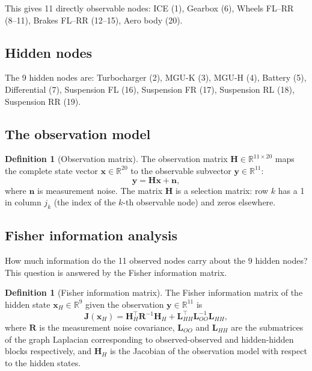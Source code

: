\documentclass[twocolumn,10pt,a4paper]{article}
\theoremstyle{definition}
\newtheorem{definition}[theorem]{Definition}
\theoremstyle{remark}
\newcommand{\R}{\mathbb{R}}
\newcommand{\vect}[1]{\boldsymbol{#1}}
\newcommand{\mat}[1]{\mathbf{#1}}
\begin{document}
This gives 11 directly observable nodes: ICE (1), Gearbox (6), Wheels FL--RR (8--11), Brakes FL--RR (12--15), Aero body (20).

\subsection{Hidden nodes}

The 9 hidden nodes are: Turbocharger (2), MGU-K (3), MGU-H (4), Battery (5), Differential (7), Suspension FL (16), Suspension FR (17), Suspension RL (18), Suspension RR (19).

\subsection{The observation model}

\begin{definition}[Observation matrix]\label{def:observation_matrix}
The observation matrix $\mat{H} \in \R^{11 \times 20}$ maps the complete state vector $\vect{x} \in \R^{20}$ to the observable subvector $\vect{y} \in \R^{11}$:
\begin{equation}\label{eq:observation}
    \vect{y} = \mat{H} \vect{x} + \vect{n},
\end{equation}
where $\vect{n}$ is measurement noise. The matrix $\mat{H}$ is a selection matrix: row $k$ has a 1 in column $j_k$ (the index of the $k$-th observable node) and zeros elsewhere.

\end{definition}

\subsection{Fisher information analysis}

How much information do the 11 observed nodes carry about the 9 hidden nodes? This question is answered by the Fisher information matrix.

\begin{definition}[Fisher information matrix]\label{def:fisher}
The Fisher information matrix of the hidden state $\vect{x}_H \in \R^9$ given the observation $\vect{y} \in \R^{11}$ is
\begin{equation}\label{eq:fisher}
    \mat{J}(\vect{x}_H) = \mat{H}_H^\top \mat{R}^{-1} \mat{H}_H + \mat{L}_{HH}^\top \mat{L}_{OO}^{-1} \mat{L}_{HH},
\end{equation}
where $\mat{R}$ is the measurement noise covariance, $\mat{L}_{OO}$ and $\mat{L}_{HH}$ are the submatrices of the graph Laplacian corresponding to observed-observed and hidden-hidden blocks respectively, and $\mat{H}_H$ is the Jacobian of the observation model with respect to the hidden states.
\end{definition}
\end{document}

